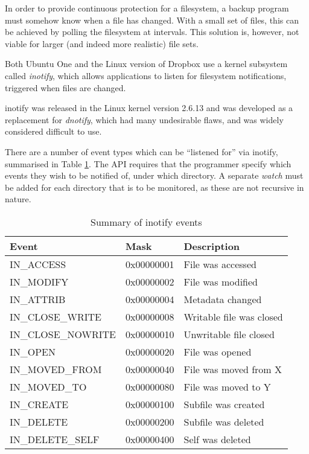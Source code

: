 In order to provide continuous protection for a filesystem, a backup program
must somehow know when a file has changed. With a small set of files, this can
be achieved by polling the filesystem at intervals. This solution is, however,
not viable for larger (and indeed more realistic) file sets.

Both Ubuntu One and the Linux version of Dropbox use a kernel subsystem called
\emph{inotify}, which allows applications to listen for filesystem
notifications, triggered when files are changed.

inotify was released in the Linux kernel version 2.6.13 and was developed as
a replacement for \emph{dnotify}, which had many undesirable flaws, and was
widely considered difficult to use\cite{love2005}.

There are a number of event types which can be ``listened for'' via inotify,
summarised in Table \ref{tab:inotify-events}. The API requires that the
programmer specify which events they wish to be notified of, under which
directory. A separate \emph{watch} must be added for each directory that is to
be monitored, as these are not recursive in nature\cite{love2005}.

\begin{table}
    \centering
    \begin{tabular}{ | l | l | l | }
        \hline
        Event               & Mask          & Description \\ \hline
        IN\_ACCESS          & 0x00000001    & File was accessed \\ \hline
        IN\_MODIFY          & 0x00000002    & File was modified \\ \hline
        IN\_ATTRIB          & 0x00000004    & Metadata changed \\ \hline
        IN\_CLOSE\_WRITE    & 0x00000008    & Writable file was closed \\ \hline
        IN\_CLOSE\_NOWRITE  & 0x00000010    & Unwritable file closed \\ \hline
        IN\_OPEN            & 0x00000020    & File was opened \\ \hline
        IN\_MOVED\_FROM     & 0x00000040    & File was moved from X \\ \hline
        IN\_MOVED\_TO       & 0x00000080    & File was moved to Y \\ \hline
        IN\_CREATE          & 0x00000100    & Subfile was created \\ \hline
        IN\_DELETE          & 0x00000200    & Subfile was deleted \\ \hline
        IN\_DELETE\_SELF    & 0x00000400    & Self was deleted \\ \hline
    \end{tabular}
    \caption{Summary of inotify events\cite{love2005}}
    \label{tab:inotify-events}
\end{table}

